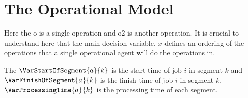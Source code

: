 
\section{The Operational Model}

Here the o is a single operation and o2 is another operation. It is crucial to understand here that the main
decision variable, $x$ defines an ordering of the operations that a single operational agent will do the 
operations in. 

The $\VarStartOfSegment{a}{k}$ is the start time of job $i$ in segment $k$ and $\VarFinishOfSegment{a}{k}$ is the finish time of job $i$ in segment $k$.
$\VarProcessingTime{a}{k}$ is the processing time of each segment. 
